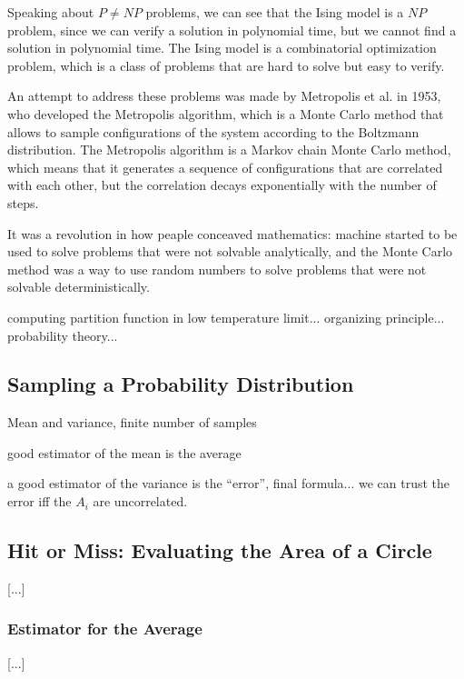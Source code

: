 Speaking about \(P \neq NP\) problems, we can see that the Ising model is a \(NP\) problem, since we can verify a solution in polynomial time, but we cannot find a solution in polynomial time. The Ising model is a combinatorial optimization problem, which is a class of problems that are hard to solve but easy to verify.

An attempt to address these problems was made by Metropolis et al. in 1953, who developed the Metropolis algorithm, which is a Monte Carlo method that allows to sample configurations of the system according to the Boltzmann distribution. The Metropolis algorithm is a Markov chain Monte Carlo method, which means that it generates a sequence of configurations that are correlated with each other, but the correlation decays exponentially with the number of steps.

It was a revolution in how peaple conceaved mathematics: machine started to be used to solve problems that were not solvable analytically, and the Monte Carlo method was a way to use random numbers to solve problems that were not solvable deterministically.

computing partition function in low temperature limit... organizing principle... probability theory...

\subsection{Sampling a Probability Distribution}

Mean and variance, finite number of samples

good estimator of the mean is the average

a good estimator of the variance is the ``error'', final formula... we can trust the error iff the \(A_i\) are uncorrelated.

\subsection{Hit or Miss: Evaluating the Area of a Circle}

[...]

\subsubsection{Estimator for the Average}

[...]


